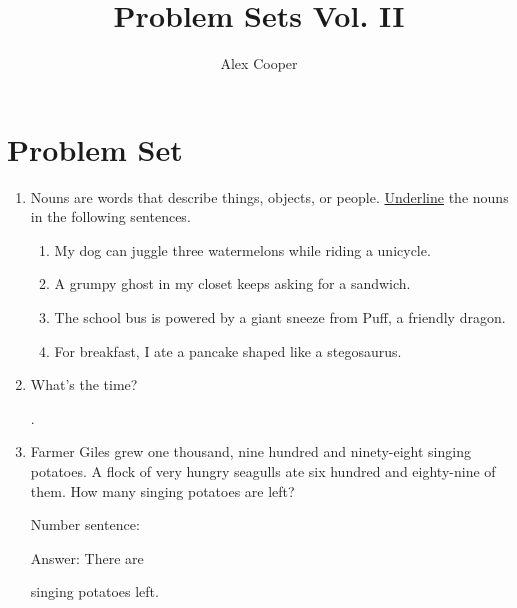 \documentclass{tufte-book}
\title{Problem Sets Vol. II}
\author[Alex Cooper]{Alex Cooper}
\begin{document}
\frontmatter

\maketitle

\mainmatter

\newpage\section{Problem Set }

\begin{enumerate}
  \item Nouns are words that describe things, objects, or people. \underline{Underline} the nouns in the following sentences.
  \begin{enumerate}
    \item My dog can juggle three watermelons while riding a unicycle.
    \item A grumpy ghost in my closet keeps asking for a sandwich.
    \item The school bus is powered by a giant sneeze from Puff, a friendly dragon.
    \item For breakfast, I ate a pancake shaped like a stegosaurus.
  \end{enumerate}

  \item \bigskip{} 
  What's the time? \dotfill\bigskip\par\dotfill\bigskip.
  
  \item Farmer Giles grew one thousand, nine hundred and ninety-eight singing potatoes.
  A flock of very hungry seagulls ate six hundred and eighty-nine of them.
  How many singing potatoes are left?\bigskip\par
Number sentence: \dotfill\bigskip\par
Answer: There are
\dotfill\bigskip\par\mbox{}\dotfill\bigskip\par\mbox{}\dotfill\bigskip\par\dotfill\bigskip
 singing potatoes left.


\end{enumerate}
\end{document}
